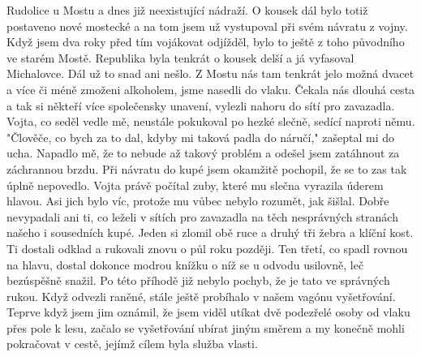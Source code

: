 
Rudolice u Mostu a dnes již neexistující nádraží. O kousek dál bylo
totiž postaveno nové mostecké a na tom jsem už vystupoval při svém
návratu z vojny. Když jsem dva roky před tím vojákovat odjížděl, bylo
to ještě z toho původního ve starém Mostě. Republika byla tenkrát o
kousek delší a já vyfasoval Michalovce. Dál už to snad ani nešlo. Z
Mostu nás tam tenkrát jelo možná dvacet a více či méně zmoženi
alkoholem, jsme nasedli do vlaku. Čekala nás dlouhá cesta a tak si
někteří více společensky unavení, vylezli nahoru do sítí pro
zavazadla. Vojta, co seděl vedle mě, neustále pokukoval po hezké
slečně, sedící naproti němu. "Člověče, co bych za to dal, kdyby mi
taková padla do náručí," zašeptal mi do ucha. Napadlo mě, že to nebude
až takový problém a odešel jsem zatáhnout za záchrannou brzdu. Při
návratu do kupé jsem okamžitě pochopil, že se to zas tak úplně
nepovedlo. Vojta právě počítal zuby, které mu slečna vyrazila úderem
hlavou. Asi jich bylo víc, protože mu vůbec nebylo rozumět, jak
šišlal. Dobře nevypadali ani ti, co leželi v sítích pro zavazadla na
těch nesprávných stranách našeho i sousedních kupé. Jeden si zlomil
obě ruce a druhý tři žebra a klíční kost. Ti dostali odklad a rukovali
znovu o půl roku později. Ten třetí, co spadl rovnou na hlavu, dostal
dokonce modrou knížku o níž se u odvodu usilovně, leč bezúspěšně
snažil. Po této příhodě již nebylo pochyb, že je tato ve správných
rukou. Když odvezli raněné, stále ještě probíhalo v našem vagónu
vyšetřování. Teprve když jsem jim oznámil, že jsem viděl utíkat dvě
podezřelé osoby od vlaku přes pole k lesu, začalo se vyšetřování
ubírat jiným směrem a my konečně mohli pokračovat v cestě, jejímž
cílem byla služba vlasti.
